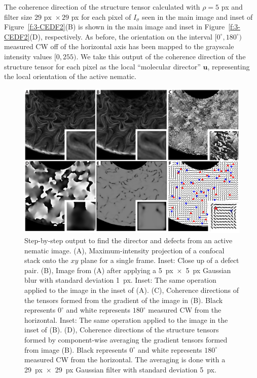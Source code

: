 The coherence direction of the structure tensor calculated with $\rho = 5$ px and filter size $29\textrm{ px } \times 29$ px for each pixel of $I_{\sigma}$ seen in the main image and inset of Figure~\ref{f:3-CEDF2}(B) is shown in the main image and inset in Figure~\ref{f:3-CEDF2}(D), respectively.
As before, the orientation on the interval $[0^{\circ}, 180^{\circ})$ measured CW off of the horizontal axis has been mapped to the grayscale intensity values $[0,255)$.
 We take this output of the coherence direction of the structure tensor for each pixel as the local ``molecular director'' $\mathbf{u}$, representing the local orientation of the active nematic.
\newpage
\begin{figure}[H]
  \centering
  \includegraphics{figures/C3/Ch3-Figs_CEDF2.png}
  \caption{Step-by-step output to find the director and defects from an active nematic image.
(A), Maximum-intensity projection of a confocal stack onto the $xy$ plane for a single frame.
Inset: Close up of a defect pair.
(B), Image from (A) after applying a 5~px~$\times$~5~px Gaussian blur with standard deviation 1~px.
Inset: The same operation applied to the image in the inset of (A).
(C), Coherence directions of the tensors formed from the gradient of the image in (B).
Black represents $0^{\circ}$ and white represents $180^{\circ}$ measured CW from the horizontal.
Inset: The same operation applied to the image in the inset of (B).
(D), Coherence directions of the structure tensors formed by component-wise averaging the gradient tensors formed from image (B).
Black represents $0^{\circ}$ and white represents $180^{\circ}$ measured CW from the horizontal.
The averaging is done with a 29~px~$\times$~29~px Gaussian filter with standard deviation 5~px.
}
\end{figure}
